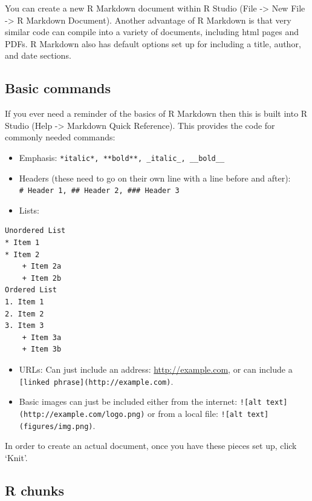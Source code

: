 \documentclass[
]{book}
\providecommand{\tightlist}{%
  \setlength{\itemsep}{0pt}\setlength{\parskip}{0pt}}
\begin{document}
You can create a new R Markdown document within R Studio (File -\textgreater{} New File -\textgreater{} R Markdown Document). Another advantage of R Markdown is that very similar code can compile into a variety of documents, including html pages and PDFs. R Markdown also has default options set up for including a title, author, and date sections.

\hypertarget{basic-commands}{%
\subsection{Basic commands}\label{basic-commands}}

If you ever need a reminder of the basics of R Markdown then this is built into R Studio (Help -\textgreater{} Markdown Quick Reference). This provides the code for commonly needed commands:

\begin{itemize}
\tightlist
\item
  Emphasis: \texttt{*italic*,\ **bold**,\ \_italic\_,\ \_\_bold\_\_}
\item
  Headers (these need to go on their own line with a line before and after): \texttt{\#\ Header\ 1,\ \#\#\ Header\ 2,\ \#\#\#\ Header\ 3}
\item
  Lists:
\end{itemize}

\begin{verbatim}
Unordered List
* Item 1
* Item 2
    + Item 2a
    + Item 2b
Ordered List
1. Item 1
2. Item 2
3. Item 3
    + Item 3a
    + Item 3b
\end{verbatim}

\begin{itemize}
\tightlist
\item
  URLs: Can just include an address: \url{http://example.com}, or can include a \texttt{{[}linked\ phrase{]}(http://example.com)}.
\item
  Basic images can just be included either from the internet: \texttt{!{[}alt\ text{]}(http://example.com/logo.png)} or from a local file: \texttt{!{[}alt\ text{]}(figures/img.png)}.
\end{itemize}

In order to create an actual document, once you have these pieces set up, click `Knit'.

\hypertarget{r-chunks}{%
\subsection{R chunks}\label{r-chunks}}
\end{document}

